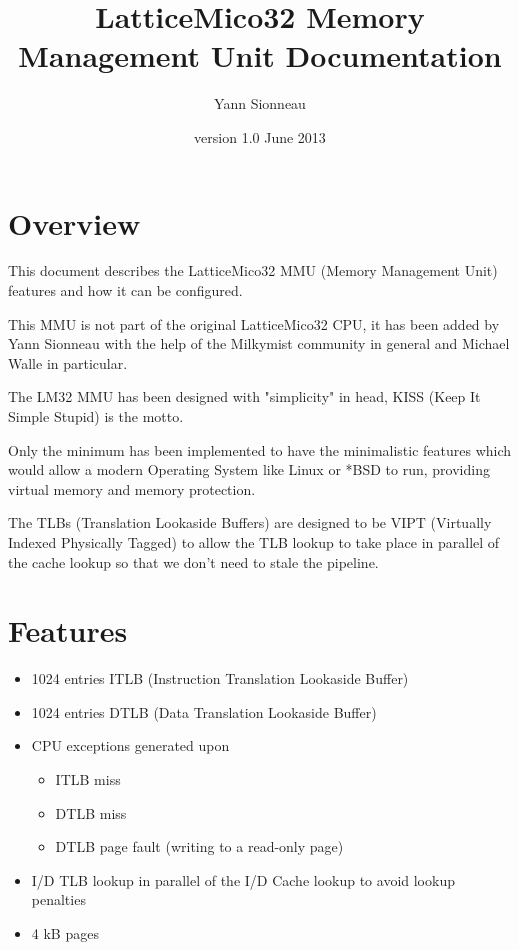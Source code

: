 \documentclass[a4paper,11pt]{article}
\title{LatticeMico32 Memory Management Unit Documentation}
\author{Yann Sionneau}
\date{version 1.0 June 2013}
\begin{document}
\setlength{\parindent}{0pt}
\setlength{\parskip}{5pt}
\maketitle{}

\tableofcontents

\section{Overview}

This document describes the LatticeMico32 MMU (Memory Management Unit) features and how it can be configured.

This MMU is not part of the original LatticeMico32 CPU, it has been added by Yann Sionneau with the help of the Milkymist community in general and Michael Walle in particular.

The LM32 MMU has been designed with "simplicity" in head, KISS (Keep It Simple Stupid) is the motto.

Only the minimum has been implemented to have the minimalistic features which would allow a modern Operating System like Linux or *BSD to run, providing virtual memory and memory protection.

The TLBs (Translation Lookaside Buffers) are designed to be VIPT (Virtually Indexed Physically Tagged) to allow the TLB lookup to take place in parallel of the cache lookup so that we don't need to stale the pipeline.

\section{Features}

\begin{itemize}
	\item 1024 entries ITLB (Instruction Translation Lookaside Buffer)
	\item 1024 entries DTLB (Data Translation Lookaside Buffer)
	\item CPU exceptions generated upon
	\begin{itemize}
			\item ITLB miss
			\item DTLB miss
			\item DTLB page fault (writing to a read-only page)
	\end{itemize}
	\item I/D TLB lookup in parallel of the I/D Cache lookup to avoid lookup penalties
	\item 4 kB pages
\end{itemize}
\end{document}
